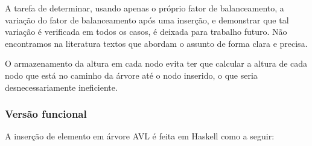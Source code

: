 A tarefa de determinar, usando apenas o próprio fator de
balanceamento, a variação do fator de balanceamento após uma inserção,
e demonstrar que tal variação é verificada em todos os casos, é
deixada para trabalho futuro. Não encontramos na literatura textos que
abordam o assunto de forma clara e precisa.

O armazenamento da altura em cada nodo evita ter que calcular a altura
de cada nodo que está no caminho da árvore até o nodo inserido, o que
seria desnecessariamente ineficiente. 

\subsubsection{Versão funcional}

A inserção de elemento em árvore AVL é feita em Haskell como a seguir:

